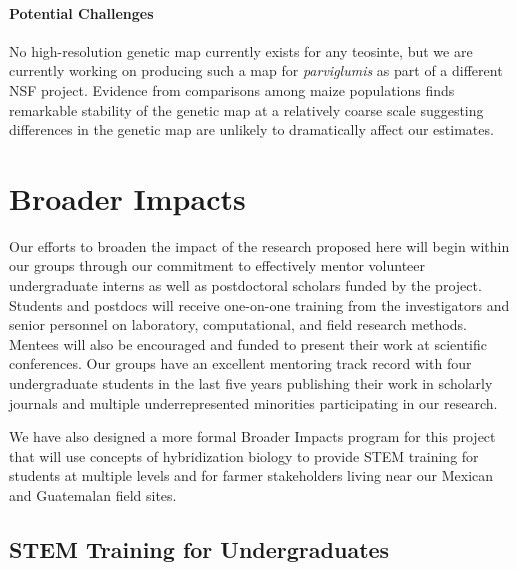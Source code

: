 \paragraph{Potential Challenges} 
No high-resolution genetic map currently exists for any teosinte, but we are currently working on producing such a map for \emph{parviglumis} as part of a different NSF project.
Evidence from comparisons among maize populations finds remarkable stability of the genetic map at a relatively coarse scale \citep{rodgers2015recombination} suggesting differences in the genetic map are unlikely to dramatically affect our estimates. 

\section*{Broader Impacts}
Our efforts to broaden the impact of the research proposed here will begin within our groups through our commitment to effectively mentor volunteer undergraduate interns as well as postdoctoral scholars funded by the project. Students and postdocs will receive one-on-one training from the investigators and senior personnel on laboratory, computational, and field research methods.  Mentees will also be encouraged and funded to present their work at scientific conferences.  Our groups have an excellent mentoring track record with four undergraduate students in the last five years publishing their work in scholarly journals and multiple underrepresented minorities participating in our research.

We have also designed a more formal Broader Impacts program for this project that will use concepts of hybridization biology to provide STEM training for students at multiple levels and for farmer stakeholders living near our Mexican and Guatemalan field sites.

\subsection*{STEM Training for Undergraduates}

